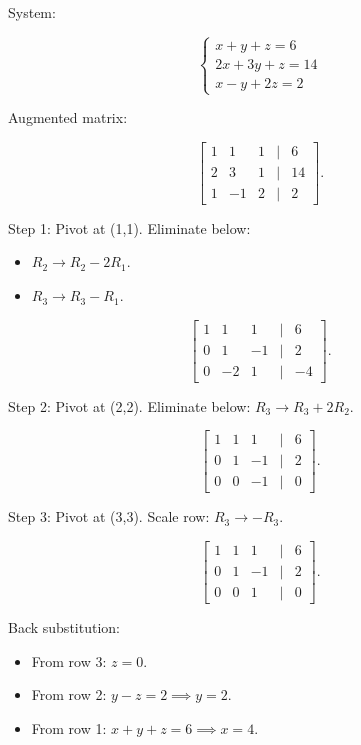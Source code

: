 \documentclass[
  letterpaper,
  DIV=11,
  numbers=noendperiod]{scrreprt}
\providecommand{\tightlist}{%
  \setlength{\itemsep}{0pt}\setlength{\parskip}{0pt}}
\begin{document}
System:

\[
\begin{cases}  
x + y + z = 6 \\  
2x + 3y + z = 14 \\  
x - y + 2z = 2  
\end{cases}
\]

Augmented matrix:

\[
\begin{bmatrix}  
1 & 1 & 1 & | & 6 \\  
2 & 3 & 1 & | & 14 \\  
1 & -1 & 2 & | & 2  
\end{bmatrix}.
\]

Step 1: Pivot at (1,1). Eliminate below:

\begin{itemize}
\tightlist
\item
  \(R_2 \to R_2 - 2R_1\).
\item
  \(R_3 \to R_3 - R_1\).
\end{itemize}

\[
\begin{bmatrix}  
1 & 1 & 1 & | & 6 \\  
0 & 1 & -1 & | & 2 \\  
0 & -2 & 1 & | & -4  
\end{bmatrix}.
\]

Step 2: Pivot at (2,2). Eliminate below: \(R_3 \to R_3 + 2R_2\).

\[
\begin{bmatrix}  
1 & 1 & 1 & | & 6 \\  
0 & 1 & -1 & | & 2 \\  
0 & 0 & -1 & | & 0  
\end{bmatrix}.
\]

Step 3: Pivot at (3,3). Scale row: \(R_3 \to -R_3\).

\[
\begin{bmatrix}  
1 & 1 & 1 & | & 6 \\  
0 & 1 & -1 & | & 2 \\  
0 & 0 & 1 & | & 0  
\end{bmatrix}.
\]

Back substitution:

\begin{itemize}
\tightlist
\item
  From row 3: \(z = 0\).
\item
  From row 2: \(y - z = 2 \implies y = 2\).
\item
  From row 1: \(x + y + z = 6 \implies x = 4\).
\end{itemize}
\end{document}
